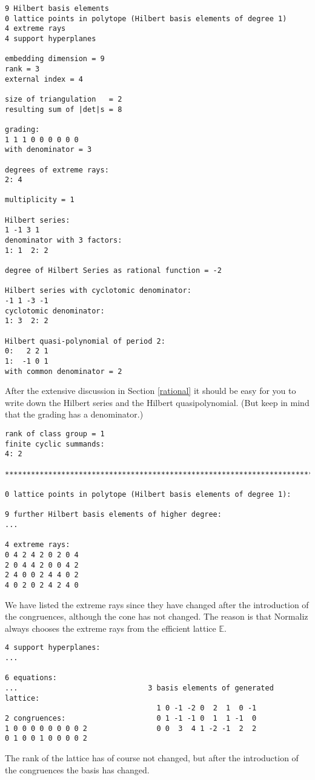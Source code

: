 \documentclass[12pt,a4paper]{scrartcl}
\theoremstyle{definition}
\def\EE{{\mathbb E}}
\begin{document}
\begin{Verbatim}
9 Hilbert basis elements
0 lattice points in polytope (Hilbert basis elements of degree 1)
4 extreme rays
4 support hyperplanes

embedding dimension = 9
rank = 3
external index = 4

size of triangulation   = 2
resulting sum of |det|s = 8

grading:
1 1 1 0 0 0 0 0 0 
with denominator = 3

degrees of extreme rays:
2: 4  

multiplicity = 1

Hilbert series:
1 -1 3 1 
denominator with 3 factors:
1: 1  2: 2  

degree of Hilbert Series as rational function = -2

Hilbert series with cyclotomic denominator:
-1 1 -3 -1 
cyclotomic denominator:
1: 3  2: 2  

Hilbert quasi-polynomial of period 2:
0:   2 2 1
1:  -1 0 1
with common denominator = 2
\end{Verbatim}
After the extensive discussion in Section \ref{rational} it should be easy for you to write down the Hilbert series and the Hilbert quasipolynomial. (But keep in mind that the grading has a denominator.)
\begin{Verbatim}
rank of class group = 1
finite cyclic summands:
4: 2  

***********************************************************************

0 lattice points in polytope (Hilbert basis elements of degree 1):

9 further Hilbert basis elements of higher degree:
...

4 extreme rays:
0 4 2 4 2 0 2 0 4
2 0 4 4 2 0 0 4 2
2 4 0 0 2 4 4 0 2
4 0 2 0 2 4 2 4 0
\end{Verbatim}
We have listed the extreme rays since they have changed after the introduction of the congruences, although the cone has not changed. The reason is that Normaliz always chooses the extreme rays from the efficient lattice $\EE$.
\begin{Verbatim}
4 support hyperplanes:
...

6 equations:
...                              3 basis elements of generated lattice:
                                   1 0 -1 -2 0  2  1  0 -1
2 congruences:                     0 1 -1 -1 0  1  1 -1  0
1 0 0 0 0 0 0 0 0 2                0 0  3  4 1 -2 -1  2  2
0 1 0 0 1 0 0 0 0 2
\end{Verbatim}
The rank of the lattice has of course not changed, but after the introduction of the congruences the basis has changed.
\end{document}
